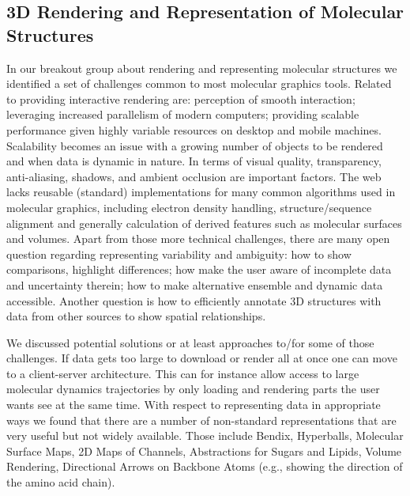 \documentclass[a4paper]{article}
\begin{document}
\subsection{3D Rendering and Representation of Molecular Structures}

In our breakout group about rendering and representing molecular structures we identified a set of challenges common to most molecular graphics tools. Related to providing interactive rendering are: perception of smooth interaction; leveraging increased parallelism of modern computers; providing scalable performance given highly variable resources on desktop and mobile machines. Scalability becomes an issue with a growing number of objects to be rendered and when data is dynamic in nature. In terms of visual quality, transparency, anti-aliasing, shadows, and ambient occlusion are important factors. The web lacks reusable (standard) implementations for many common algorithms used in molecular graphics, including electron density handling, structure/sequence alignment and generally calculation of derived features such as molecular surfaces and volumes. Apart from those more technical challenges, there are many open question regarding representing variability and ambiguity: how to show comparisons, highlight differences; how make the user aware of incomplete data and uncertainty therein; how to make alternative ensemble and dynamic data accessible. Another question is how to efficiently annotate 3D structures with data from other sources to show spatial relationships.

We discussed potential solutions or at least approaches to/for some of those challenges. If data gets too large to download or render all at once one can move to a client-server architecture. This can for instance allow access to large molecular dynamics trajectories by only loading and rendering parts the user wants see at the same time. With respect to representing data in appropriate ways we found that there are a number of non-standard representations that are very useful but not widely available. Those include Bendix, Hyperballs, Molecular Surface Maps, 2D Maps of Channels, Abstractions for Sugars and Lipids, Volume Rendering, Directional Arrows on Backbone Atoms (e.g., showing the direction of the amino acid chain).
\end{document}
